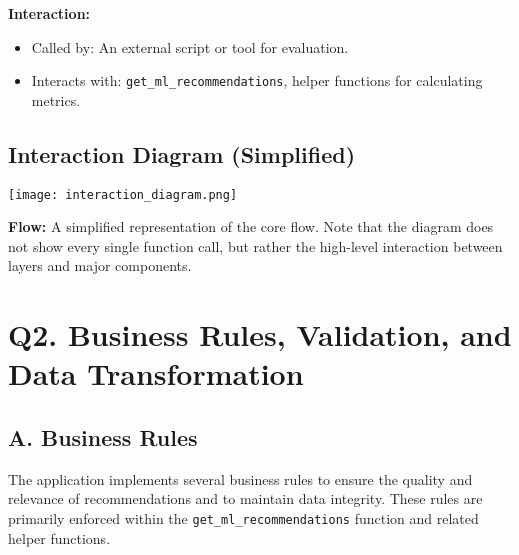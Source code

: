 \documentclass[12pt,a4paper]{article}
\begin{document}
\textbf{Interaction:}
\begin{itemize}
    \item  Called by: An external script or tool for evaluation.
    \item Interacts with: \texttt{get\_ml\_recommendations},  helper functions for calculating metrics.
\end{itemize}

\subsection*{Interaction Diagram (Simplified)}
\begin{center}
\texttt{[image: interaction\_diagram.png]}
\end{center}


\noindent \textbf{Flow:}  A simplified representation of the core flow.  Note that the diagram does not show every single function call, but rather the high-level interaction between layers and major components.

\section*{Q2.  Business Rules, Validation, and Data Transformation}

\subsection*{A. Business Rules}

The application implements several business rules to ensure the quality and relevance of recommendations and to maintain data integrity.  These rules are primarily enforced within the \texttt{get\_ml\_recommendations} function and related helper functions.
\end{document}
